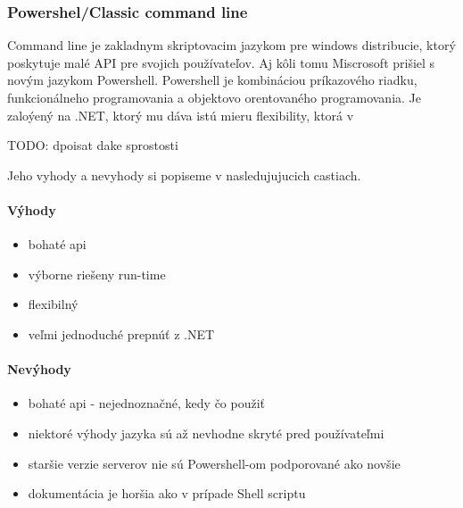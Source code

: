 \subsubsection{Powershel/Classic command line}
\indent  
Command line je zakladnym skriptovacim jazykom pre windows distribucie, ktorý poskytuje malé API  pre svojich používateľov. Aj kôli tomu Miscrosoft prišiel s novým jazykom Powershell. Powershell je kombináciou príkazového riadku, funkcionálneho programovania a objektovo orentovaného programovania. Je zaloýený na .NET, ktorý mu dáva istú mieru flexibility, ktorá v 

TODO: dpoisat dake sprostosti

Jeho vyhody a nevyhody si popiseme v nasledujujucich castiach.

\paragraph{Výhody}
\begin{itemize}
	\item bohaté api
	\item výborne riešeny run-time 
	\item flexibilný
	\item veľmi jednoduché prepnúť z .NET
	\newline
\end{itemize}
\paragraph{Nevýhody}
\begin{itemize}
	\item bohaté api - nejednoznačné, kedy čo použiť
	\item niektoré výhody jazyka sú až nevhodne skryté pred používateľmi
	\item staršie verzie serverov nie sú Powershell-om podporované ako novšie
	\item dokumentácia je horšia ako v prípade Shell scriptu
	\newline
\end{itemize}

